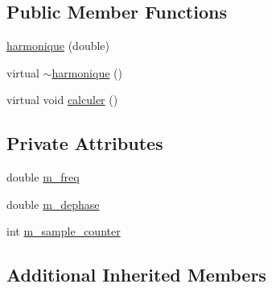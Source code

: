 \subsection*{Public Member Functions}
\begin{DoxyCompactItemize}
\item 
\hyperlink{classharmonique_ac4326b55d526129329391f36991e2f73}{harmonique} (double)
\item 
virtual \hyperlink{classharmonique_a48a057f7ba6e8ff4e443c15da0cd2019}{$\sim$harmonique} ()
\item 
virtual void \hyperlink{classharmonique_a4dbd729dfa443204d9834effbb63d816}{calculer} ()
\end{DoxyCompactItemize}
\subsection*{Private Attributes}
\begin{DoxyCompactItemize}
\item 
double \hyperlink{classharmonique_a8f9a721707c36033703863f22d6b70a8}{m\-\_\-freq}
\item 
double \hyperlink{classharmonique_a2ba9d8b0702651bbbf67d4d7f7316c3e}{m\-\_\-dephase}
\item 
int \hyperlink{classharmonique_a648d5e64e0e8b8a5c9d4af4146ad93ae}{m\-\_\-sample\-\_\-counter}
\end{DoxyCompactItemize}
\subsection*{Additional Inherited Members}


